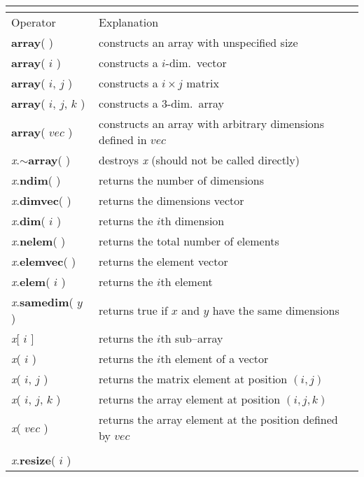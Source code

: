 \begin{tabular}{l|l}
\multicolumn{2}{c}{\hspace*{\columnwidth}\hspace*{-2\tabcolsep}\mbox{}}\\[-1.5ex]
\hline
Operator & Explanation \\
\hline
{\sffamily\bfseries\small array}( ) & constructs an array with unspecified size\\
{\sffamily\bfseries\small array}( $i$ ) & constructs a $i$-dim.\ vector\\
{\sffamily\bfseries\small array}( $i$, $j$ ) & constructs a $i\times j$ matrix\\
{\sffamily\bfseries\small array}( $i$, $j$, $k$ ) & constructs a 3-dim.\ array\\
{\sffamily\bfseries\small array}( $vec$ ) & constructs an array with arbitrary dimensions defined in $vec$\\
{\em x}.{\sffamily\bfseries\small $\sim$array}( ) &
destroys {\em x} (should not be called directly)\\
\hline
{\em x}.{\sffamily\bfseries\small ndim}( ) & returns the number of dimensions\\
{\em x}.{\sffamily\bfseries\small dimvec}( ) & returns the dimensions vector \\
{\em x}.{\sffamily\bfseries\small dim}( $i$ ) & returns the $i$th dimension \\
{\em x}.{\sffamily\bfseries\small nelem}( ) & returns the total number of elements\\
{\em x}.{\sffamily\bfseries\small elemvec}( ) & returns the element vector\\
{\em x}.{\sffamily\bfseries\small elem}( $i$ ) & returns the $i$th element\\
{\em x}.{\sffamily\bfseries\small samedim}( $y$ ) & returns true if $x$ and $y$ have the same dimensions\\
\hline
{\em x}$[$ $i$ $]$ & returns the $i$th sub--array\\
{\em x}( $i$ ) & returns the $i$th element of a vector\\
{\em x}( $i$, $j$ ) & returns the matrix element at position $(i,j)$\\
{\em x}( $i$, $j$, $k$ ) & returns the array element at position $(i,j,k)$\\
{\em x}( $vec$ ) & returns the array element at the position defined by $vec$\\
\hline
\\[-2.5ex]
{\em x}.{\sffamily\bfseries\small resize}( $i$ ) &

\end{tabular}
